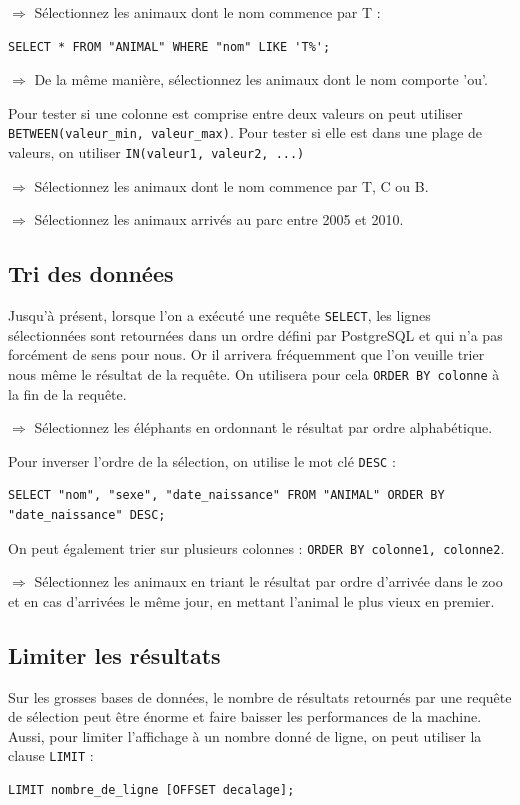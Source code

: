 \documentclass[11pt]{article}
\newcommand{\action}{$\Rightarrow$ }
\begin{document}
\action Sélectionnez les animaux dont le nom commence par T :
\begin{lstlisting}
SELECT * FROM "ANIMAL" WHERE "nom" LIKE 'T%';				
\end{lstlisting}

\action De la même manière, sélectionnez les animaux dont le nom comporte 'ou'.

Pour tester si une colonne est comprise entre deux valeurs on peut utiliser \lstinline{BETWEEN(valeur_min, valeur_max)}. Pour tester si elle est dans une plage de valeurs, on utiliser \lstinline{IN(valeur1, valeur2, ...)}

\action Sélectionnez les animaux dont le nom commence par T, C ou B.

\action Sélectionnez les animaux arrivés au parc entre 2005 et 2010.


\subsection{Tri des données}
Jusqu'à présent, lorsque l'on a exécuté une requête \lstinline{SELECT}, les lignes sélectionnées sont retournées dans un ordre défini par PostgreSQL et qui n'a pas forcément de sens pour nous. Or il arrivera fréquemment que l'on veuille trier nous même le résultat de la requête. On utilisera pour cela \lstinline{ORDER BY colonne} à la fin de la requête.

\action Sélectionnez les éléphants en ordonnant le résultat par ordre alphabétique.

Pour inverser l'ordre de la sélection, on utilise le mot clé \lstinline{DESC} :
\begin{lstlisting}
SELECT "nom", "sexe", "date_naissance" FROM "ANIMAL" ORDER BY "date_naissance" DESC;
\end{lstlisting}

On peut également trier sur plusieurs colonnes : \lstinline{ORDER BY colonne1, colonne2}.

\action Sélectionnez les animaux en triant le résultat par ordre d'arrivée dans le zoo et en cas d'arrivées le même jour, en mettant l'animal le plus vieux en premier.


\subsection{Limiter les résultats}
Sur les grosses bases de données, le nombre de résultats retournés par une requête de sélection peut être énorme et faire baisser les performances de la machine. Aussi, pour limiter l'affichage à un nombre donné de ligne, on peut utiliser la clause \lstinline{LIMIT} :
\begin{lstlisting}
LIMIT nombre_de_ligne [OFFSET decalage];
\end{lstlisting}
\end{document}

